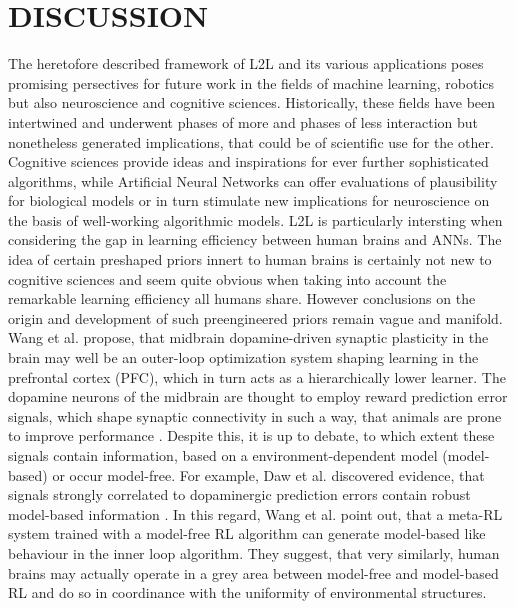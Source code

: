 \documentclass[letterpaper, 10 pt, conference]{ieeeconf}  %
\begin{document}
\section{DISCUSSION}
 
The heretofore described framework of L2L and its various applications poses promising persectives for future work in the fields 
of machine learning, robotics but also neuroscience and cognitive sciences. Historically, these fields have been intertwined and underwent
phases of more and phases of less interaction but nonetheless generated implications, that could be of scientific use for the other. Cognitive 
sciences provide ideas and inspirations for ever further sophisticated algorithms, while Artificial Neural Networks can offer evaluations of 
plausibility for biological models or in turn stimulate new implications for neuroscience on the basis of well-working algorithmic models. L2L
is particularly intersting when considering the gap in learning efficiency between human brains and ANNs. The idea of certain preshaped 
priors innert to human brains is certainly not new to cognitive sciences and seem quite obvious when taking into account the remarkable 
learning efficiency all humans share. However conclusions on the origin and development of such preengineered priors remain vague
and manifold. Wang et al.\cite{wangPrefrontalCortexMetareinforcement2018} propose,
that midbrain dopamine-driven synaptic plasticity in the brain may well be an outer-loop optimization system shaping 
learning in the prefrontal cortex (PFC), 
which in turn acts as a hierarchically lower learner. The dopamine neurons of the midbrain are thought to employ reward prediction 
error signals, which shape synaptic connectivity in such a way, that animals are prone to improve performance 
\cite{montagueFrameworkMesencephalicDopamine1996}. Despite this, it is 
up to debate, to which extent these signals contain information, based on a environment-dependent model (model-based) or occur model-free.
For example, Daw et al.\cite{dawModelbasedInfluencesHumans2011} discovered evidence, that signals strongly correlated to 
dopaminergic prediction errors contain robust model-based
information \cite{botvinickReinforcementLearningFast2019}\cite{dawModelbasedInfluencesHumans2011}.
In this regard, Wang et al.\cite{wangPrefrontalCortexMetareinforcement2018} point out, that a meta-RL system trained with a model-free RL algorithm 
can generate model-based like behaviour in the inner loop algorithm. They suggest, that very similarly, 
human brains may actually operate in a grey area between 
model-free and model-based RL and do so in coordinance with the uniformity of environmental structures. \newline
\end{document}

